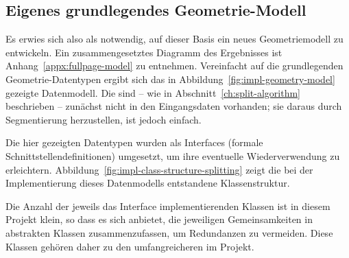 \documentclass[../main/thesis.tex]{subfiles}
\begin{document}
\subsection{Eigenes grundlegendes Geometrie-Modell}
\label{ch:data-structures-new}

Es erwies sich also als notwendig, auf dieser Basis ein neues Geometriemodell zu entwickeln.
Ein zusammengesetztes Diagramm des Ergebnisses ist Anhang~\ref{appx:fullpage-model} zu entnehmen.
Vereinfacht auf die grundlegenden Geometrie-Datentypen ergibt sich das in Abbildung~\ref{fig:impl-geometry-model} gezeigte Datenmodell.
Die  sind -- wie in Abschnitt~\ref{ch:split-algorithm} beschrieben -- zunächst nicht in den Eingangsdaten vorhanden; sie daraus durch Segmentierung herzustellen, ist jedoch einfach.



Die hier gezeigten Datentypen wurden als Interfaces (formale Schnittstellendefinitionen) umgesetzt, um ihre eventuelle Wiederverwendung zu erleichtern. 
Abbildung~\ref{fig:impl-class-structure-splitting} zeigt die bei der Implementierung dieses Datenmodells entstandene Klassenstruktur.


Die Anzahl der jeweils das Interface implementierenden Klassen ist in diesem Projekt klein, so dass es sich anbietet, die jeweiligen Gemeinsamkeiten in abstrakten Klassen
zusammenzufassen, um Redundanzen zu vermeiden.
Diese Klassen gehören daher zu den umfangreicheren im Projekt.
\end{document}
